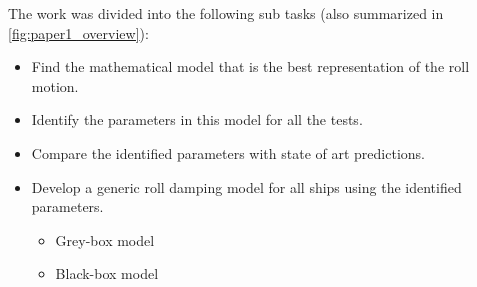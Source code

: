 \noindent The work was divided into the following sub tasks (also summarized in \autoref{fig:paper1_overview}): 
\begin{itemize}
    \item Find the mathematical model that is the best representation of the roll motion.
    \item Identify the parameters in this model for all the tests.
    \item Compare the identified parameters with state of art predictions.
    \item Develop a generic roll damping model for all ships using the identified parameters.
    \begin{itemize}
        \item Grey-box model
        \item Black-box model
    \end{itemize}
\end{itemize}

